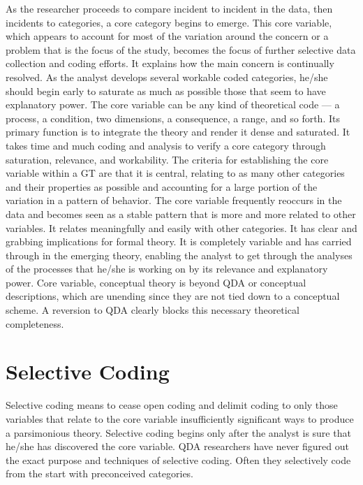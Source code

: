 As the researcher proceeds to compare incident to incident in the data, then incidents to categories, 
a core category begins to emerge. 
This core variable,
which appears to account for most of the variation around the concern or
a problem that is the focus of the study, 
becomes the focus of further selective data collection and coding efforts.
It explains how the main concern is continually resolved. 
As the analyst develops several workable coded categories, he/she should begin early to saturate as much as possible those that seem to have explanatory power. 
The core variable can be any kind of theoretical code --- a process, 
a condition, two dimensions, a consequence, a range, and so forth. 
Its primary function is to integrate the theory and render it dense and saturated. 
It takes time and much coding and analysis to verify a core category through saturation, relevance, and workability. 
The criteria for establishing the core variable within a GT are that it is central, relating to as many other categories and their properties as possible and accounting for a large portion of the variation in a pattern of behavior. 
The core variable frequently reoccurs in the data and becomes seen as a stable pattern that is more and more related to other variables. 
It relates meaningfully and easily with other categories. 
It has clear and grabbing implications for formal theory. 
It is completely variable and has carried through in the emerging theory,
enabling the analyst to get through the analyses of the processes that he/she is working on by its relevance and explanatory power. 
Core variable, 
conceptual theory is beyond QDA or conceptual descriptions, which are unending since they are not tied down to a conceptual scheme. 
A reversion to QDA clearly blocks this necessary theoretical completeness.

\section*{Selective Coding}

Selective coding means to cease open coding and delimit coding to only those variables that relate to the core variable insufficiently significant ways to produce a parsimonious theory. 
Selective coding begins only after the analyst is sure that he/she has discovered the core variable. 
QDA researchers have never figured out the exact purpose and techniques of selective coding. 
Often they selectively code from the start with preconceived categories.


